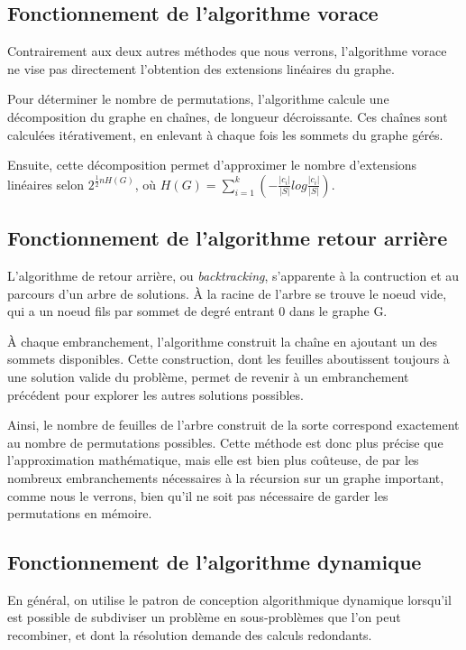 \documentclass[10pt,a4paper]{article}
\begin{document}
\subsection{Fonctionnement de l'algorithme vorace}

Contrairement aux deux autres méthodes que nous verrons, l'algorithme vorace ne vise pas directement l'obtention des extensions linéaires du graphe. 

Pour déterminer le nombre de permutations, l'algorithme calcule une décomposition du graphe en chaînes, de longueur décroissante. Ces chaînes sont calculées itérativement, en enlevant à chaque fois les sommets du graphe gérés.

Ensuite, cette décomposition permet d'approximer le nombre d'extensions linéaires selon $ 2^{ \frac{1}{2} n H(G)} $, où $ H(G) = \sum_{i=1}^{k} (- \frac{|c_{i}|}{|S|} log \frac{|c_{i}|}{|S|} ) $.

\subsection{Fonctionnement de l'algorithme retour arrière}

L'algorithme de retour arrière, ou \textit{backtracking}, s'apparente à la contruction et au parcours d'un arbre de solutions. À la racine de l'arbre se trouve le noeud vide, qui a un noeud fils par sommet de degré entrant 0 dans le graphe G.

À chaque embranchement, l'algorithme construit la chaîne en ajoutant un des sommets disponibles. Cette construction, dont les feuilles aboutissent toujours à une solution valide du problème, permet de revenir à un embranchement précédent pour explorer les autres solutions possibles.

Ainsi, le nombre de feuilles de l'arbre construit de la sorte correspond exactement au nombre de permutations possibles. Cette méthode est donc plus précise que l'approximation mathématique, mais elle est bien plus coûteuse, de par les nombreux embranchements nécessaires à la récursion sur un graphe important, comme nous le verrons, bien qu'il ne soit pas nécessaire de garder les permutations en mémoire.

\subsection{Fonctionnement de l'algorithme dynamique}

En général, on utilise le patron de conception algorithmique dynamique lorsqu'il est possible de subdiviser un problème en sous-problèmes que l'on peut recombiner, et dont la résolution demande des calculs redondants.
\end{document}
